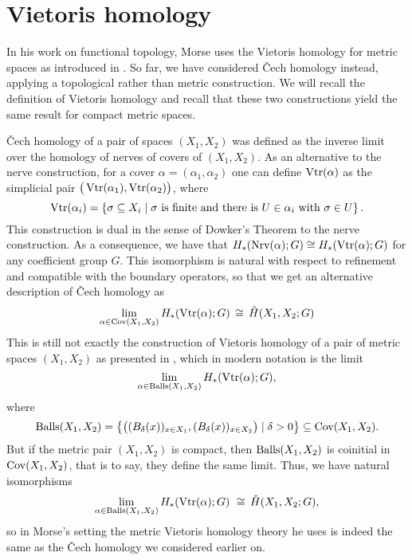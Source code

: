 
\section{Vietoris homology} \label{s:vietoris}

In his work on functional topology, Morse uses the Vietoris homology for metric spaces as introduced in \cite{MR1512371}. So far, we have considered \v{C}ech homology instead, applying a topological rather than metric construction.
We will recall the definition of Vietoris homology and recall that these two constructions yield the same result for compact metric spaces.

\v{C}ech homology of a pair of spaces $(X_{1}, X_{2})$ was defined as the inverse limit over the homology of nerves of covers of $(X_{1}, X_{2})$.
As an alternative to the nerve construction, for a cover $\alpha = (\alpha_{1}, \alpha_{2})$ one can define $\operatorname{Vtr}(\alpha)$ as the simplicial pair $\big(\operatorname{Vtr} (\alpha_{1}), \operatorname{Vtr} (\alpha_{2})\big)$, where 
\[
\operatorname{Vtr} (\alpha_{i}) = \left\{ \sigma \subseteq X_{i} \mid \sigma \text{ is finite and there is } U \in \alpha_{i} \text{ with } \sigma \in U \right\}.
\]
This construction is dual in the sense of Dowker's Theorem \cite{Dowker.1952} to the nerve construction.
As a consequence, we have that
$
H_{*} (\operatorname{Nrv} (\alpha); G) \cong H_{*} (\operatorname{Vtr} (\alpha); G)
$
for any coefficient group $G$.
This isomorphism is natural with respect to refinement and compatible with the boundary operators, so that we get an alternative description of \v{C}ech homology as 
\[
\lim_{\alpha \in \operatorname{Cov} (X_{1}, X_{2})} H_{*} (\operatorname{Vtr} (\alpha); G) \, \cong\, \check{H} (X_{1}, X_{2}; G)
\]
This is still not exactly the construction of Vietoris homology of a pair of metric spaces $(X_{1}, X_{2})$ as presented in \cite{MR1512371}, which in modern notation is the limit
\begin{equation*}
    \lim_{\alpha \in \operatorname{Balls}(X_{1}, X_{2})} H_{*} (\operatorname{Vtr} (\alpha); G),
\end{equation*}
where 
\[
\operatorname{Balls} (X_{1}, X_{2}) = \left\{ \big( ( B_{\delta} (x) )_{x \in X_{1}} , ( B_{\delta} (x) )_{x \in X_{2}} \big) \mid \delta > 0 \right\}
\subseteq \operatorname{Cov} (X_{1}, X_{2}).
\]
But if the metric pair $(X_{1}, X_{2})$ is compact, then $\operatorname{Balls} (X_{1}, X_{2})$ is coinitial in $\operatorname{Cov} (X_{1}, X_{2})$, that is to say, they define the same limit.
Thus, we have natural isomorphisms
\[
\lim_{\alpha \in \operatorname{Balls}(X_{1}, X_{2})} H_{*} (\operatorname{Vtr} (\alpha); G) \ \cong \,
\check{H} (X_{1}, X_{2}; G),
\]
so in Morse's setting the metric Vietoris homology theory he uses is indeed the same as the \v{C}ech homology we considered earlier on.